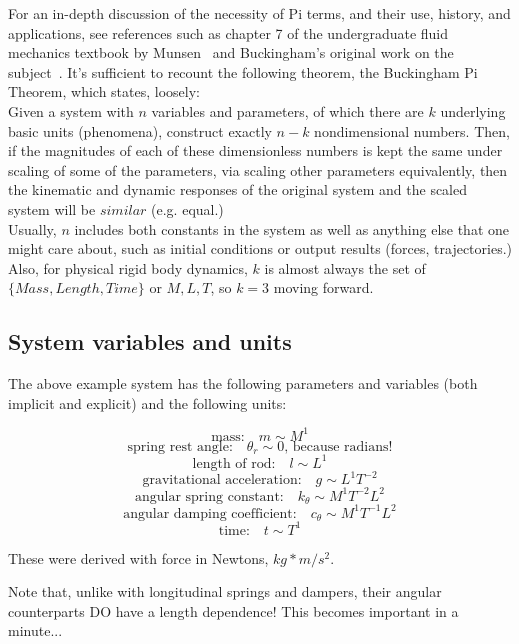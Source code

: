 \documentclass[12pt,letterpaper]{article}
\begin{document}
For an in-depth discussion of the necessity of Pi terms, and their use, history, and applications, see references such as chapter 7 of the undergraduate fluid mechanics textbook by Munsen~\cite{munson2013fundamentals} and Buckingham's original work on the subject~\cite{buckingham1914physically}.
It's sufficient to recount the following theorem, the Buckingham Pi Theorem, which states, loosely: \\


Given a system with $n$ variables and parameters, of which there are $k$ underlying basic units (phenomena), construct exactly $n-k$ nondimensional numbers.
Then, if the magnitudes of each of these dimensionless numbers is kept the same under scaling of some of the parameters, via scaling other parameters equivalently, then the kinematic and dynamic responses of the original system and the scaled system will be $similar$ (e.g. equal.) \\


Usually, $n$ includes both constants in the system as well as anything else that one might care about, such as initial conditions or output results (forces, trajectories.)
Also, for physical rigid body dynamics, $k$ is almost always the set of $\{Mass, Length, Time\}$ or $M, L, T$, so $k=3$ moving forward.

\subsection{System variables and units}

The above example system has the following parameters and variables (both implicit and explicit) and the following units:

\[
\text{mass:} \quad m \sim M^1
\]
\[
\text{spring rest angle:} \quad \theta_r \sim 0 \text{, because radians!}
\]
\[
\text{length of rod:} \quad l \sim L^1
\]
\[
\text{gravitational acceleration:} \quad g \sim L^1 T^{-2}
\]
\[
\text{angular spring constant:} \quad k_{\theta} \sim M^1 T^{-2} L^2 
\]
\[
\text{angular damping coefficient:} \quad c_{\theta} \sim M^1 T^{-1} L^2
\]
\[
\text{time:} \quad t \sim T^1
\]

These were derived with force in Newtons, $kg*m/s^2$.

Note that, unlike with longitudinal springs and dampers, their angular counterparts DO have a length dependence! This becomes important in a minute...
\end{document}
